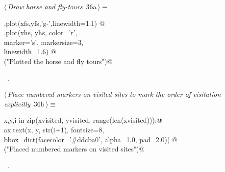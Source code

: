\documentclass[11.5pt]{report}
\begin{document}
\begin{flushleft} \small
\begin{minipage}{\linewidth}\label{scrap42}\raggedright\small
{} $\langle\,${\itshape Draw horse and fly-tours}\nobreak\ {\footnotesize {36a}}$\,\rangle\equiv$
\vspace{-1ex}
\begin{list}{}{} \item
\mbox{}\verb@ax.plot(xfs,yfs,'g-',linewidth=1.1)  @\\
\mbox{}\verb@ax.plot(xhs, yhs, color='r', \@\\
\mbox{}\verb@        marker='s', markersize=3, \@\\
\mbox{}\verb@        linewidth=1.6) @\\
\mbox{}\verb@debug("Plotted the horse and fly tours")@\\
\mbox{}\verb@@{\NWsep}
\end{list}
\vspace{-1.5ex}
\footnotesize
\begin{list}{}{\setlength{\itemsep}{-\parsep}\setlength{\itemindent}{-\leftmargin}}
\item \NWtxtMacroRefIn\ .

\item{}
\end{list}
\end{minipage}\vspace{4ex}
\end{flushleft}

\begin{flushleft} \small\label{scrap43}\raggedright\small
{} $\langle\,${\itshape Place numbered markers on visited sites to mark the order of visitation explicitly}\nobreak\ {\footnotesize {36b}}$\,\rangle\equiv$
\vspace{-1ex}
\begin{list}{}{} \item
\mbox{}\verb@for x,y,i in zip(xvisited, yvisited, range(len(xvisited))):@\\
\mbox{}\verb@     ax.text(x, y, str(i+1),  fontsize=8, \@\\
\mbox{}\verb@             bbox=dict(facecolor='#ddcba0', alpha=1.0, pad=2.0)) @\\
\mbox{}\verb@debug("Placed numbered markers on visited sites")@\\
\mbox{}\verb@@{\NWsep}
\end{list}
\vspace{-1.5ex}
\footnotesize
\begin{list}{}{\setlength{\itemsep}{-\parsep}\setlength{\itemindent}{-\leftmargin}}
\item \NWtxtMacroRefIn\ .

\item{}
\end{list}
\vspace{4ex}
\end{flushleft}
\end{document}
